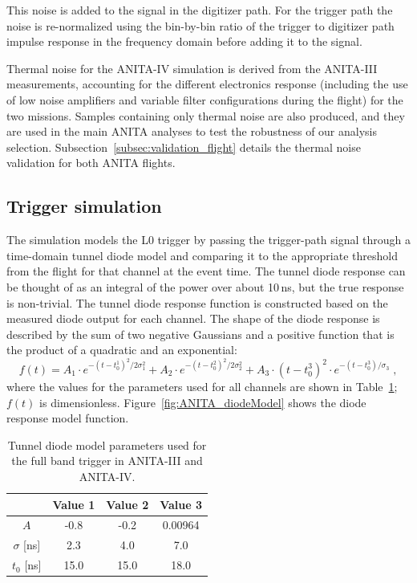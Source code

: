 This noise is added to the signal in the digitizer path.
For the trigger path the noise is re-normalized using the bin-by-bin ratio of the
trigger to digitizer path impulse response in the frequency domain
before adding it to the signal.

Thermal noise for the ANITA-IV simulation is derived from the ANITA-III measurements, accounting for the different electronics response (including the use of low noise amplifiers and variable filter configurations during the flight) for the two missions.
Samples containing only thermal noise are also produced, and they are used in
the main ANITA analyses to test the robustness of our analysis selection.
Subsection~\ref{subsec:validation_flight} details the thermal noise validation for both ANITA flights.


\subsection{Trigger simulation}
\label{subsec:ANITA_trigger}
The simulation models the L0 trigger by passing the
trigger-path signal through a time-domain tunnel diode model and comparing it to the
appropriate threshold from the flight for that channel at the event
time.
The tunnel diode response can be thought of as an integral of the power over about 10\,ns, but the true response is non-trivial.
The tunnel diode response function is constructed based on the
measured diode output for each channel.
The shape of the diode response is described by the sum of two negative Gaussians and a positive function that is the product of a quadratic and an exponential:
\begin{equation}
      f(t) = A_1 \cdot e^{-(t-t_0^1)^2/2\sigma_1^2} + 
      A_2 \cdot e^{-(t-t_0^2)^2/2\sigma_2^2} +
      A_3 \cdot \left( t-t_0^3 \right)^2 \cdot
      e^{-(t-t_0^3)/\sigma_3} \;,
    \end{equation}
\noindent where the values for the parameters used for all channels are shown in
Table~\ref{tab:diodeModelParameters};
$f(t)$ is dimensionless.
Figure~\ref{fig:ANITA_diodeModel} shows the diode response model function.

\begin{table}[h!]
\caption{Tunnel diode model parameters used for the full band trigger in ANITA-III and ANITA-IV.}
  \begin{center}
    \begin{tabular}{c|c|c|c} 
      & Value 1 & Value 2 & Value 3 \\
     \hline
      $A$           & -0.8  & -0.2   &  0.00964   \\
      $\sigma$ [ns] &  2.3  &  4.0   &  7.0       \\ 
      $t_0$  [ns]   & 15.0  & 15.0   & 18.0       \\
    \end{tabular}
  \end{center}
  \label{tab:diodeModelParameters}
\end{table}


